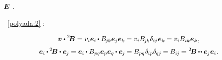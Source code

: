 \vspace{-0.2em}\nopagebreak\noindent
{} ${\hspace{-0.15ex}\bm{E}}$  .

 ~\eqref{polyada:2}     :

\nopagebreak\vspace{-0.2em}\begin{equation*}
\bm{v} \dotp {^2\!\bm{B}} =
v_i\bm{e}_i \hspace{-0.1ex} \dotp B_{\hspace{-0.2ex}j\hspace{-0.1ex}k}\bm{e}_{\hspace{-0.1ex}j} \bm{e}_k \hspace{-0.1ex} =
v_i B_{\hspace{-0.2ex}j\hspace{-0.1ex}k} \delta_{i\hspace{-0.1ex}j} \hspace{.1ex} \bm{e}_k \hspace{-0.1ex} =
v_i B_{ik} \bm{e}_k
\hspace{.1ex} ,
\end{equation*}
\nopagebreak\vspace{-1.33em}
\begin{equation}\label{tensorcomponents}
\bm{e}_i \hspace{-0.1ex} \dotp \hspace{-0.1ex} {^2\!\bm{B}} \dotp \bm{e}_{\hspace{-0.1ex}j} \hspace{-0.1ex} =
\bm{e}_i \hspace{-0.1ex} \dotp B_{pq}\bm{e}_p\bm{e}_q \hspace{-0.1ex} \dotp \bm{e}_{\hspace{-0.1ex}j} \hspace{-0.15ex} =
\hspace{-0.1ex} B_{pq} \hspace{.1ex} \delta_{\hspace{-0.1ex}ip} \delta_{\hspace{-0.1ex}qj} \hspace{-0.15ex} =
\hspace{-0.1ex} B_{i\hspace{-0.1ex}j} \hspace{-0.15ex} =
{^2\!\bm{B}} \hspace{-0.1ex} \dotdotp \bm{e}_{\hspace{-0.1ex}j} \bm{e}_i
\hspace{.1ex} .
\end{equation}

